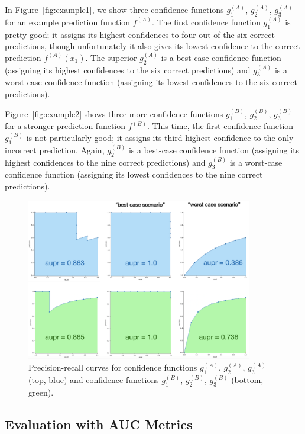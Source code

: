 \documentclass[11pt]{article}
\begin{document}
In Figure~\ref{fig:example1}, we show three confidence functions $g_1^{(A)}$, $g_2^{(A)}$, $g_3^{(A)}$ for an example prediction function $f^{(A)}$. The first confidence function $g_1^{(A)}$ is pretty good; it assigns its highest confidences to four out of the six correct predictions, though unfortunately it also gives its lowest confidence to the correct prediction $f^{(A)}(x_1)$. The superior $g_2^{(A)}$ is a best-case confidence function (assigning its highest confidences to the six correct predictions) and $g_3^{(A)}$ is a worst-case confidence function (assigning its lowest confidences to the six correct predictions).

Figure~\ref{fig:example2} shows three more confidence functions $g_1^{(B)}$, $g_2^{(B)}$, $g_3^{(B)}$ for a stronger prediction function $f^{(B)}$. This time, the first confidence function $g_1^{(B)}$ is not particularly good; it assigns its third-highest confidence to the only incorrect prediction. Again, $g_2^{(B)}$ is a best-case confidence function (assigning its highest confidences to the nine correct predictions) and $g_3^{(B)}$ is a worst-case confidence function (assigning its lowest confidences to the nine correct predictions). 

\begin{figure}[t]
\centering
\includegraphics[width=0.88\textwidth]{pr_curves.png}
\caption{Precision-recall curves for confidence functions $g_1^{(A)}$, $g_2^{(A)}$, $g_3^{(A)}$ (top, blue) and confidence functions $g_1^{(B)}$, $g_2^{(B)}$, $g_3^{(B)}$ (bottom, green).}
\label{fig:pr_curves}
\end{figure}


\subsection{Evaluation with AUC Metrics}
\end{document}
